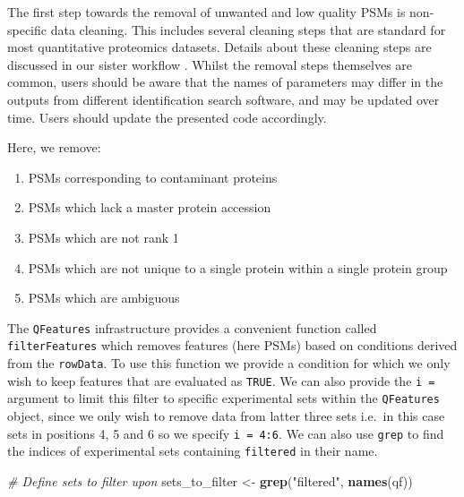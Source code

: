 \documentclass[9pt,a4paper,]{extarticle}
\newenvironment{Shaded}{\begin{snugshade}}{\end{snugshade}}
\newcommand{\CommentTok}[1]{\textcolor[rgb]{0.56,0.35,0.01}{\textit{#1}}}
\newcommand{\FunctionTok}[1]{\textcolor[rgb]{0.13,0.29,0.53}{\textbf{#1}}}
\newcommand{\NormalTok}[1]{#1}
\newcommand{\OtherTok}[1]{\textcolor[rgb]{0.56,0.35,0.01}{#1}}
\newcommand{\StringTok}[1]{\textcolor[rgb]{0.31,0.60,0.02}{#1}}
\begin{document}
The first step towards the removal of unwanted and low quality PSMs is non-specific
data cleaning. This includes several cleaning steps that are standard for most
quantitative proteomics datasets. Details about these cleaning steps are discussed
in our sister workflow \citep{Hutchings2023}. Whilst the removal steps themselves are
common, users should be aware that the names of parameters may differ in the
outputs from different identification search software, and may be updated over
time. Users should update the presented code accordingly.

Here, we remove:

\begin{enumerate}
\def\labelenumi{\arabic{enumi}.}
\item
  PSMs corresponding to contaminant proteins
\item
  PSMs which lack a master protein accession
\item
  PSMs which are not rank 1
\item
  PSMs which are not unique to a single protein within a single protein group
\item
  PSMs which are ambiguous
\end{enumerate}

The \texttt{QFeatures} infrastructure provides a convenient function called
\texttt{filterFeatures} which removes features (here PSMs) based on conditions derived
from the \texttt{rowData}. To use this function we provide a condition for which we
only wish to keep features that are evaluated as \texttt{TRUE}. We can also provide the
\texttt{i\ =} argument to limit this filter to specific experimental sets within the
\texttt{QFeatures} object, since we only wish to remove data from latter three sets
i.e.~in this case sets in positions 4, 5 and 6 so we specify \texttt{i\ =\ 4:6}. We
can also use \texttt{grep} to find the indices of experimental sets containing
\texttt{filtered} in their name.

\begin{Shaded}
\begin{Highlighting}[]
\CommentTok{\# Define sets to filter upon}
\NormalTok{sets\_to\_filter }\OtherTok{\textless{}{-}} \FunctionTok{grep}\NormalTok{(}\StringTok{"filtered"}\NormalTok{, }\FunctionTok{names}\NormalTok{(qf))}
\end{Highlighting}
\end{Shaded}
\end{document}
